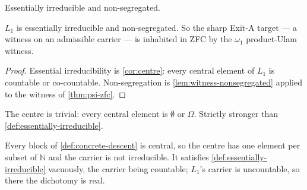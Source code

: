 \begin{definition}
  \label{def:admissible}
  \leanok
  Essentially irreducible and non-segregated.
\end{definition}

\begin{theorem}
  \label{thm:l1-admissible}
  \leanok
  $L_1$ is essentially irreducible and non-segregated. So the sharp Exit-A
  target --- a witness on an admissible carrier --- is inhabited in ZFC by the
  $\omega_1$ product-Ulam witness.
\end{theorem}

\begin{proof}
  \leanok
  Essential irreducibility is \ref{cor:centre}: every central element of $L_1$ is
  countable or co-countable. Non-segregation is \ref{lem:witness-nonsegregated}
  applied to the witness of \ref{thm:psi-zfc}.
\end{proof}

\begin{definition}
  \label{def:irreducible}
  \leanok
  The centre is trivial: every central element is $\emptyset$ or $\Omega$.
  Strictly stronger than \ref{def:essentially-irreducible}.
\end{definition}

\begin{theorem}
  \label{thm:descent-not-irreducible}
  \leanok
  Every block of \ref{def:concrete-descent} is central, so the centre has one
  element per subset of $\mathbb{N}$ and the carrier is not irreducible. It
  satisfies \ref{def:essentially-irreducible} vacuously, the carrier being
  countable; $L_1$'s carrier is uncountable, so there the dichotomy is real.
\end{theorem}

